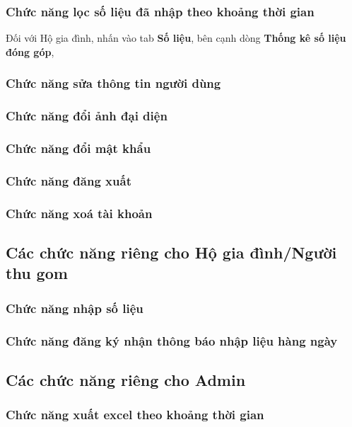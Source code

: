 \subsubsection{Chức năng lọc số liệu đã nhập theo khoảng thời gian}
Đối với Hộ gia đình, nhấn vào tab \textbf{Số liệu}, bên cạnh dòng \textbf{Thống kê số liệu đóng góp}, 
\subsubsection{Chức năng sửa thông tin người dùng}
\subsubsection{Chức năng đổi ảnh đại diện}
\subsubsection{Chức năng đổi mật khẩu}
\subsubsection{Chức năng đăng xuất}
\subsubsection{Chức năng xoá tài khoản}

\subsection{Các chức năng riêng cho Hộ gia đình/Người thu gom}
\subsubsection{Chức năng nhập số liệu}
\subsubsection{Chức năng đăng ký nhận thông báo nhập liệu hàng ngày}

\subsection{Các chức năng riêng cho Admin}
\subsubsection{Chức năng xuất excel theo khoảng thời gian}

\newpage